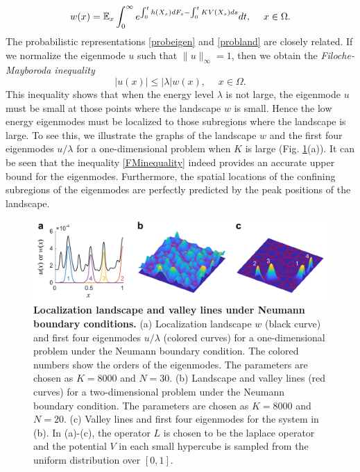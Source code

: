 \documentclass[a4paper,11pt]{article}
\begin{document}
\begin{equation}\label{probland}
w(x) = \mathbb{E}_x \int_{0}^{\infty} e^{\int_{0}^{t} h(X_s) d F_s - \int_{0}^{t} KV(X_s) ds} dt, \quad \; x \in \Omega.
\end{equation}
The probabilistic representations \eqref{probeigen} and \eqref{probland} are closely related. If we normalize the eigenmode $u$ such that $\|u\|_\infty = 1$, then we obtain the \emph{Filoche-Mayboroda inequality}
\begin{equation}\label{FMinequality}
|u(x)| \leq |\lambda| w(x), \quad \; x \in \Omega.
\end{equation}
This inequality shows that when the energy level $\lambda$ is not large, the eigenmode $u$ must be small at those points where the landscape $w$ is small. Hence the low energy eigenmodes must be localized to those subregions where the landscape is large. To see this, we illustrate the graphs of the landscape $w$ and the first four eigenmodes $u/\lambda$ for a one-dimensional problem when $K$ is large (Fig. \ref{fig1}(a)). It can be seen that the inequality \eqref{FMinequality} indeed provides an accurate upper bound for the eigenmodes. Furthermore, the spatial locations of the confining subregions of the eigenmodes are perfectly predicted by the peak positions of the landscape.
\begin{figure}
\centering\includegraphics[width=\linewidth]{Fig1}
\caption{\textbf{Localization landscape and valley lines under Neumann boundary conditions.} (a) Localization landscape $w$ (black curve) and first four eigenmodes $u/\lambda$ (colored curves) for a one-dimensional problem under the Neumann boundary condition. The colored numbers show the orders of the eigenmodes. The parameters are chosen as $K = 8000$ and $N = 30$. (b) Landscape and valley lines (red curves) for a two-dimensional problem under the Neumann boundary condition. The parameters are chosen as $K = 8000$ and $N = 20$. (c) Valley lines and first four eigenmodes for the system in (b). In (a)-(c), the operator $L$ is chosen to be the laplace operator and the potential $V$ in each small hypercube is sampled from the uniform distribution over $[0,1]$. }
\label{fig1}
\end{figure}
\end{document}

